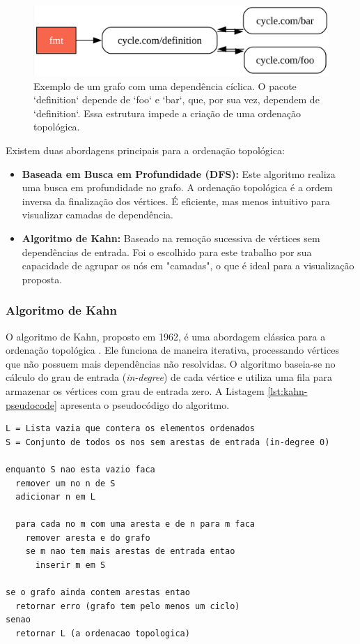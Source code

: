 \documentclass[12pt]{article}
\begin{document}
\begin{figure}[htbp]
    \centering
    \includegraphics[width=1\textwidth]{examples/cycle.png}
    \caption{Exemplo de um grafo com uma dependência cíclica. O pacote `definition` depende de `foo` e `bar`, que, por sua vez, dependem de `definition`. Essa estrutura impede a criação de uma ordenação topológica.}
    \label{fig:grafo-ciclico}
\end{figure}

\FloatBarrier

Existem duas abordagens principais para a ordenação topológica:

\begin{itemize}
    \item \textbf{Baseada em Busca em Profundidade (DFS):} Este algoritmo realiza uma busca em profundidade no grafo. A ordenação topológica é a ordem inversa da finalização dos vértices. É eficiente, mas menos intuitivo para visualizar camadas de dependência.
    \item \textbf{Algoritmo de Kahn:} Baseado na remoção sucessiva de vértices sem dependências de entrada. Foi o escolhido para este trabalho por sua capacidade de agrupar os nós em "camadas", o que é ideal para a visualização proposta.
\end{itemize}

\subsubsection{Algoritmo de Kahn}
O algoritmo de Kahn, proposto em 1962, é uma abordagem clássica para a ordenação topológica \cite{kahn1962}. Ele funciona de maneira iterativa, processando vértices que não possuem mais dependências não resolvidas. O algoritmo baseia-se no cálculo do grau de entrada (\textit{in-degree}) de cada vértice e utiliza uma fila para armazenar os vértices com grau de entrada zero. A Listagem \ref{lst:kahn-pseudocode} apresenta o pseudocódigo do algoritmo.

\begin{lstlisting}[language={}, caption={Pseudocódigo do Algoritmo de Kahn}, label={lst:kahn-pseudocode}]
L = Lista vazia que contera os elementos ordenados
S = Conjunto de todos os nos sem arestas de entrada (in-degree 0)

enquanto S nao esta vazio faca
  remover um no n de S
  adicionar n em L

  para cada no m com uma aresta e de n para m faca
    remover aresta e do grafo
    se m nao tem mais arestas de entrada entao
      inserir m em S

se o grafo ainda contem arestas entao
  retornar erro (grafo tem pelo menos um ciclo)
senao
  retornar L (a ordenacao topologica)
\end{lstlisting}
\end{document}
